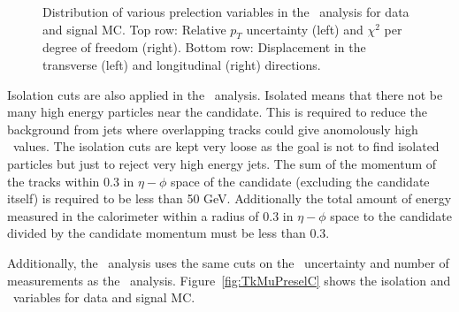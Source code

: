 \begin{figure}
  \caption[Distribution of relative \pt\ uncertainty, $\chi^2$ per degree of freedom, and transverse and longitudinal
displacement in the \tktof\ analysis for data and signal MC.]
{Distribution of various prelection variables in the \tktof\ analysis for data and signal MC.
Top row: Relative $p_T$ uncertainty (left) and $\chi^2$ per degree of freedom (right).
Bottom row: Displacement in the transverse (left) and longitudinal (right) directions.}
    \label{fig:TkMuPreselB}
\end{figure}

Isolation cuts are also applied in the \tktof\ analysis. Isolated means that there not be many high energy particles near the candidate.
This is required to reduce the background from jets where overlapping tracks could give
anomolously high \dedx\ values. The isolation cuts are kept very loose as the goal is not to find isolated particles but just to reject very high energy jets.
The sum of the momentum of the tracks within 0.3 in $\eta-\phi$ space of the candidate (excluding the candidate itself) is required to be less than 50 GeV. Additionally the total
amount of energy measured in the calorimeter within a radius of 0.3 in $\eta-\phi$ space to the candidate divided by the candidate momentum must be less than 0.3.

Additionally, the \tktof\ analysis uses the same cuts on the \invbeta\ uncertainty and number of measurements as the \muononly\ analysis.
Figure~\ref{fig:TkMuPreselC} shows the isolation and \invbeta\ variables for data and signal MC.

